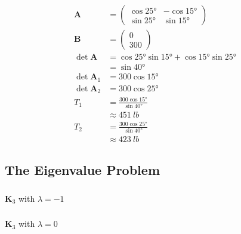 \documentclass{article}
\begin{document}
\begin{align*}
  \mathbf{A}        & = \begin{pmatrix}
                          \cos \ang{25} & -\cos \ang{15} \\
                          \sin \ang{25} & \sin \ang{15}
                        \end{pmatrix}                            \\
  \mathbf{B}        & = \begin{pmatrix}
                          0 \\
                          300
                        \end{pmatrix}                                            \\
  \det \mathbf{A}   & = \cos \ang{25} \sin \ang{15} + \cos \ang{15} \sin \ang{25} \\
                    & = \sin \ang{40}                                             \\
  \det \mathbf{A}_1 & = 300 \cos \ang{15}                                         \\
  \det \mathbf{A}_2 & = 300 \cos \ang{25}                                         \\
  T_1               & = \frac{300 \cos \ang{15}}{\sin \ang{40}}                   \\
                    & \approx \qty{451}{lb}                                       \\
  T_2               & = \frac{300 \cos \ang{25}}{\sin \ang{40}}                   \\
                    & \approx \qty{423}{lb}
\end{align*}

\subsection{The Eigenvalue Problem}

\subsubsection{}

$\mathbf{K}_3$ with $\lambda = -1$

\setcounter{subsubsection}{2}
\subsubsection{}

$\mathbf{K}_3$ with $\lambda = 0$
\end{document}
